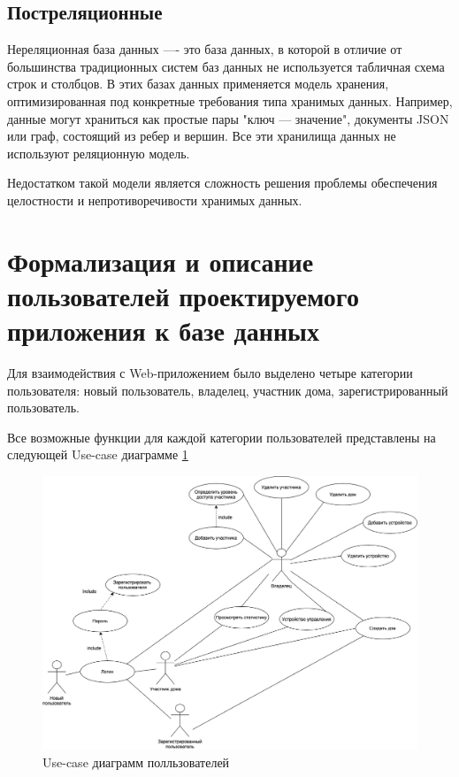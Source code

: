 \subsection{Постреляционные}

Нереляционная база данных —- это база данных, в которой в отличие от большинства традиционных систем баз данных 
не используется табличная схема строк и столбцов. В этих базах данных применяется модель хранения, оптимизированная 
под конкретные требования типа хранимых данных. Например, данные могут храниться как простые пары "ключ — значение", 
документы JSON или граф, состоящий из ребер и вершин. Все эти хранилища данных не используют реляционную модель. 


Недостатком такой модели является сложность решения проблемы обеспечения целостности и непротиворечивости хранимых данных.


\section{Формализация и описание пользователей проектируемого приложения к базе данных}
Для взаимодействия с Web-приложением было выделено четыре категории пользователя: новый пользователь,
владелец, участник дома, зарегистрированный пользователь.

Все возможные функции для каждой категории пользователей представлены на следующей Use-case диаграмме \ref{img:iot}
\begin{figure}[h]
    \includegraphics[width=0.9\linewidth]{img/iot.png}
    \caption{Use-case диаграмм полльзователей}
    \label{img:iot}
\end{figure}
\noindent

